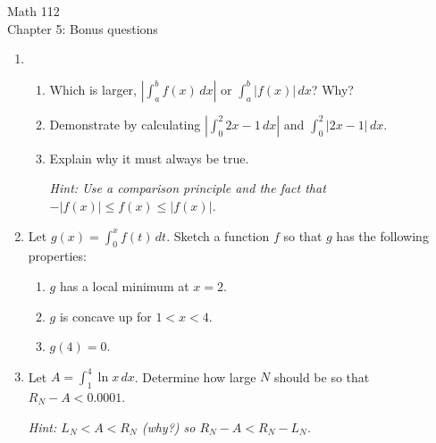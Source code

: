 \documentclass[11pt]{article}
\begin{document}
\begin{center}
\Large
\rm{Math 112}
\\
\rm{Chapter 5:  Bonus questions}
\\
\vspace{0.2in}

\end{center}

\begin{enumerate}

\item{
  \begin{enumerate}
  \item{Which is larger, $\left|\int_a^b f(x) \, dx\right|$ or $\int_a^b |f(x)| \, dx$?  Why?}

    \vspace{0.2in}
  \item{Demonstrate by calculating $\left|\int_0^2 2x-1 \, dx\right|$ and $\int_0^2 |2x-1| \, dx$.}

    \vspace{0.2in}
  \item{Explain why it must always be true.  \\

    \vspace{0.1in}
    
  \emph{Hint: Use a comparison principle and the fact that $-|f(x)| \leq f(x) \leq |f(x)|$.}}
      \end{enumerate}
}

  \vspace{1in}

    
\item{Let $g(x) = \int_0^x f(t) \, dt$.  Sketch a function $f$ so that $g$ has the following properties:

  \begin{enumerate}
\item{$g$ has a local minimum at $x=2$.}
\item{$g$ is concave up for  $1<x<4$.}
    \item{$g(4) = 0$.}
  \end{enumerate}

  }

  \vspace{1.8in}
  
\item{Let $A = \int_1^4 \ln{x}\, dx$.  Determine how large $N$ should be so that $R_N-A < 0.0001$. \\

  \vspace{0.1in}

  \emph{Hint: $L_N<A<R_N$ (why?) so $R_N-A < R_N-L_N$.  }
}


\end{enumerate}
\end{document}
